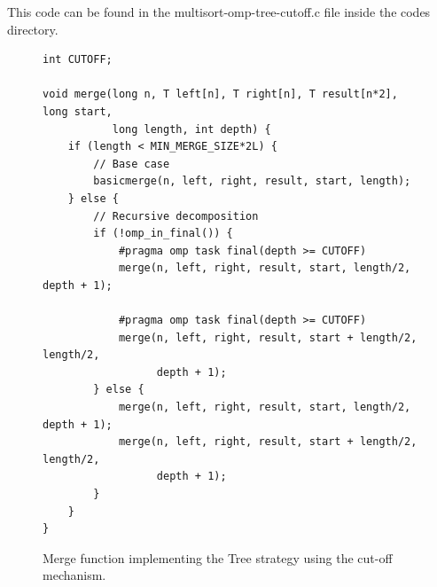 \documentclass[12pt, a4paper]{article}
\begin{document}
This code can be found in the multisort-omp-tree-cutoff.c file inside the codes directory.

\begin{figure}[H]
\begin{lstlisting}
int CUTOFF;

void merge(long n, T left[n], T right[n], T result[n*2], long start,
		   long length, int depth) {
    if (length < MIN_MERGE_SIZE*2L) {
        // Base case
        basicmerge(n, left, right, result, start, length);
    } else {
        // Recursive decomposition
        if (!omp_in_final()) {
			#pragma omp task final(depth >= CUTOFF)
			merge(n, left, right, result, start, length/2, depth + 1);
			
			#pragma omp task final(depth >= CUTOFF)
			merge(n, left, right, result, start + length/2, length/2,
				  depth + 1);
		} else {
			merge(n, left, right, result, start, length/2, depth + 1);
			merge(n, left, right, result, start + length/2, length/2,
				  depth + 1);
		}
    }
}
\end{lstlisting}

\caption{Merge function implementing the Tree strategy using the cut-off mechanism.}
\end{figure}
\end{document}
